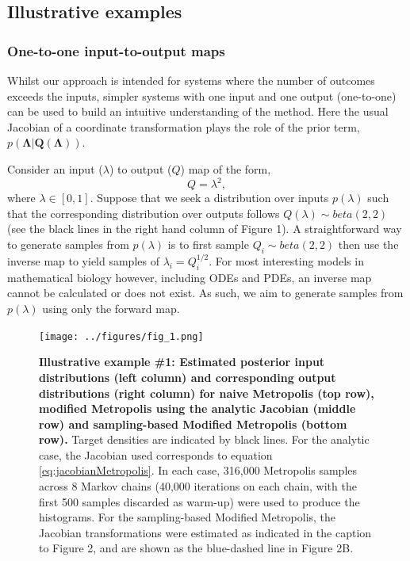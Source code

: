 \documentclass[10pt,letterpaper]{article}
\begin{document}
\subsection{Illustrative examples}\label{sec:illustrativeExamples}

\subsubsection{One-to-one input-to-output maps}
\label{sec:one-2-one}
Whilst our approach is intended for systems where the number of outcomes exceeds the inputs, simpler systems with one input and one output (one-to-one) can be used to build an intuitive understanding of the method. Here the usual Jacobian of a coordinate transformation plays the role of the prior term,  $p(\boldsymbol{\Lambda}|\boldsymbol{Q}(\boldsymbol{\Lambda}))$.

\bigskip
{}

Consider an input ($\lambda$) to output ($Q$) map of the form,
%
\begin{equation}\label{eq:quadratic_functional}
Q = \lambda^{2},
\end{equation}
%
where $\lambda\in[0,1]$. Suppose that we seek a distribution over inputs $p(\lambda)$ such that the corresponding distribution over outputs follows $Q(\lambda) \sim beta(2,2)$ (see the black lines in the right hand column of Figure 1). A straightforward way to generate samples from $p(\lambda)$ is to first sample $Q_i \sim beta(2,2)$ then use the inverse map to yield samples of $\lambda_i = Q_i^{1/2}$. For most interesting models in mathematical biology however, including ODEs and PDEs, an inverse map cannot be calculated or does not exist. As such, we aim to generate samples from $p(\lambda)$ using only the forward map.


\begin{figure}[H]
	\centerline{\texttt{[image: ../figures/fig\_1.png]}}
	\caption{\textbf{Illustrative example \#1: Estimated posterior input distributions (left column) and corresponding output distributions (right column) for naive Metropolis (top row), modified Metropolis using the analytic Jacobian (middle row) and sampling-based Modified Metropolis (bottom row).} Target densities are indicated by black lines. For the analytic case, the Jacobian used corresponds to equation \eqref{eq:jacobianMetropolis}. In each case, 316,000 Metropolis samples across 8 Markov chains (40,000 iterations on each chain, with the first 500 samples discarded as warm-up) were used to produce the histograms. For the sampling-based Modified Metropolis, the Jacobian transformations were estimated as indicated in the caption to Figure 2, and are shown as the blue-dashed line in Figure 2B.}
	\label{fig:example_1}
\end{figure}
\end{document}
